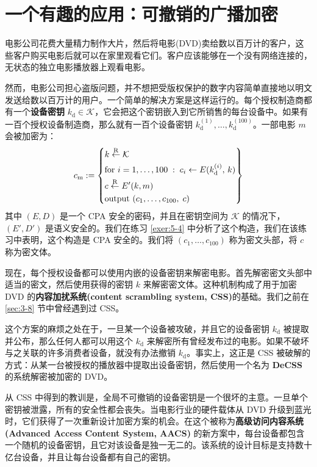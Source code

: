 \section{一个有趣的应用：可撤销的广播加密}\label{sec:5-6}

电影公司花费大量精力制作大片，然后将电影(DVD)卖给数以百万计的客户，这些客户购买电影后就可以在家里观看它们。客户应该能够在一个没有网络连接的，无状态的独立电影播放器上观看电影。

然而，电影公司担心盗版问题，并不想把受版权保护的数字内容简单直接地以明文发送给数以百万计的用户。一个简单的解决方案是这样运行的。每个授权制造商都有一个\textbf{设备密钥} $k_\mathrm{d}\in\mathcal{K}$，它会把这个密钥嵌入到它所销售的每台设备中。如果有一百个授权设备制造商，那么就有一百个设备密钥 $k^{(1)}_\mathrm{d}, \dots, k^{(100)}_\mathrm{d}$。一部电影 $m$ 会被加密为：
\[
c_\mathrm{m}:=
\left\{
\begin{aligned}
& k\overset{\rm R}\leftarrow\mathcal{K}\\
& \text{for } i=1,\dots,100\;:\; c_i\leftarrow E(k^{(i)}_\mathrm{d},\,k)\\
& c\overset{\rm R}\leftarrow E'(k,m)\\
& \text{output } (c_1,\dots,c_{100},\;c)
\end{aligned}
\right\}
\]
其中 $(E,D)$ 是一个 CPA 安全的密码，并且在密钥空间为 $\mathcal{K}$ 的情况下，$(E',D')$ 是语义安全的。我们在练习 \ref{exer:5-4} 中分析了这个构造，我们在该练习中表明，这个构造是 CPA 安全的。我们将 $(c_1, \dots, c_{100})$ 称为密文头部，将 $c$ 称为密文体。

现在，每个授权设备都可以使用内嵌的设备密钥来解密电影。首先解密密文头部中适当的密文，然后使用获得的密钥 $k$ 来解密密文体。这种机制构成了用于加密 DVD 的\textbf{内容加扰系统(content scrambling system, CSS)}的基础。我们之前在 \ref{sec:3-8} 节中曾经遇到过 CSS。

这个方案的麻烦之处在于，一旦某一个设备被攻破，并且它的设备密钥 $k_\mathrm{d}$ 被提取并公布，那么任何人都可以用这个 $k_\mathrm{d}$ 来解密所有曾经发布过的电影。如果不破坏与之关联的许多消费者设备，就没有办法撤销 $k_\mathrm{d}$。事实上，这正是 CSS 被破解的方式：从某一台被授权的播放器中提取出设备密钥，然后使用一个名为 \textbf{DeCSS} 的系统解密被加密的 DVD。

从 CSS 中得到的教训是，全局不可撤销的设备密钥是一个很坏的主意。一旦单个密钥被泄露，所有的安全性都会丧失。当电影行业的硬件载体从 DVD 升级到蓝光时，它们获得了一次重新设计加密方案的机会。在这个被称为\textbf{高级访问内容系统 (Advanced Access Content System, AACS)} 的新方案中，每台设备都包含一个随机的设备密钥，且它对该设备是独一无二的。该系统的设计目标是支持数十亿台设备，并且让每台设备都有自己的密钥。

